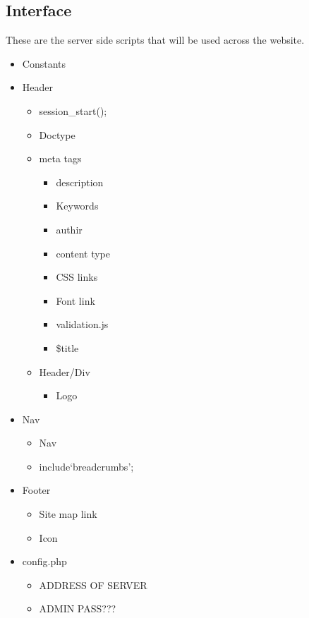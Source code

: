 \subsection{Interface}
These are the server side scripts that will be used across the website.

\begin{itemize}
	\item Constants	
	\item Header
	\begin{itemize}
		\item session\_start();
		\item Doctype
		\item meta tags
		\begin{itemize}
			\item description
			\item Keywords
			\item authir
			\item content type
			\item CSS links
			\item Font link
			\item validation.js
			\item \$title
		\end{itemize}
		\item Header/Div
		\begin{itemize}
			\item Logo
		\end{itemize}
	\end{itemize}

	\item Nav
	\begin{itemize}
		\item Nav
		\item include`breadcrumbs';
	\end{itemize}
	\item Footer 
	\begin{itemize}
		\item Site map link 
		\item Icon
	\end{itemize}
		
	\item config.php
	\begin{itemize}
		\item ADDRESS OF SERVER
		\item ADMIN PASS???
	\end{itemize}


\end{itemize}
